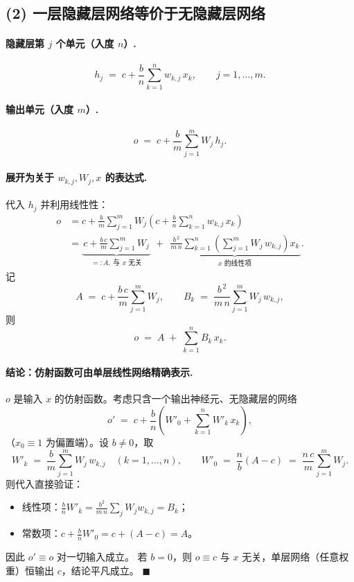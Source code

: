 \documentclass[12pt]{article}
\begin{document}
\subsection*{(2) 一层隐藏层网络等价于无隐藏层网络}

\paragraph{隐藏层第 $j$ 个单元（入度 $n$）.}
\[
h_j \;=\; c + \frac{b}{n}\sum_{k=1}^{n}w_{k,j}\,x_k,\qquad j=1,\dots,m.
\]

\paragraph{输出单元（入度 $m$）.}
\[
o \;=\; c + \frac{b}{m}\sum_{j=1}^{m}W_j\,h_j.
\]

\paragraph{展开为关于 $w_{k,j},W_j,x$ 的表达式.}
代入 $h_j$ 并利用线性性：
\[
\begin{aligned}
o &= c + \frac{b}{m}\sum_{j=1}^{m}W_j\!\left(c + \frac{b}{n}\sum_{k=1}^{n}w_{k,j}\,x_k\right)\\[4pt]
  &= \underbrace{\,c + \frac{b\,c}{m}\sum_{j=1}^{m}W_j\,}_{=:A,\;\text{与 }x\text{ 无关}}
   \;+\;
     \underbrace{\,\frac{b^{\,2}}{m\,n}\sum_{k=1}^{n}\!\left(\sum_{j=1}^{m}W_j\,w_{k,j}\right)\!x_k\,}_{x\text{ 的线性项}}.
\end{aligned}
\]
记
\[
A\;=\;c+\frac{b\,c}{m}\sum_{j=1}^{m}W_j,
\qquad
B_k\;=\;\frac{b^{\,2}}{m\,n}\sum_{j=1}^{m}W_j\,w_{k,j},
\]
则
\[
\boxed{\;
o \;=\; A \;+\; \sum_{k=1}^{n} B_k\,x_k.
\;}
\]

\paragraph{结论：仿射函数可由单层线性网络精确表示.}
$o$ 是输入 $x$ 的仿射函数。考虑只含一个输出神经元、无隐藏层的网络
\[
o' \;=\; c + \frac{b}{n}\!\left(W'_0 + \sum_{k=1}^{n}W'_k\,x_k\right),
\]
（$x_0\equiv 1$ 为偏置端）。设 $b\neq 0$，取
\[
W'_k\;=\;\frac{b}{m}\sum_{j=1}^{m}W_j\,w_{k,j}\quad(k=1,\dots,n),
\qquad
W'_0\;=\;\frac{n}{b}(A-c)\;=\;\frac{n\,c}{m}\sum_{j=1}^{m}W_j.
\]
则代入直接验证：
\begin{itemize}
  \item 线性项：$\displaystyle\frac{b}{n}W'_k=\frac{b^{2}}{m\,n}\sum_j W_j w_{k,j}=B_k$；
  \item 常数项：$\displaystyle c+\frac{b}{n}W'_0=c+(A-c)=A$。
\end{itemize}
因此 $o'\equiv o$ 对一切输入成立。
若 $b=0$，则 $o\equiv c$ 与 $x$ 无关，单层网络（任意权重）恒输出 $c$，结论平凡成立。
$\blacksquare$
\end{document}
